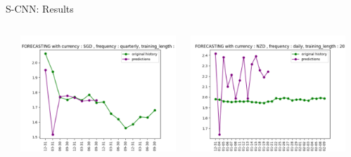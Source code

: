 \documentclass[aspectratio=169, 12pt]{beamer}
\begin{document}
\begin{frame}[allowframebreaks]{S-CNN: Results}
\begin{columns}
\begin{column}{0.25\textwidth}
    \end{column}
    \begin{column}{0.25\textwidth}
        \includegraphics[width=\linewidth]{plots/r2.png}
    \end{column}
    \begin{column}{0.25\textwidth}
        \includegraphics[width=\linewidth]{plots/r3.png}
    \end{column}
    \begin{column}{0.25\textwidth}

\end{column}
\end{columns}
\end{frame}
\end{document}
